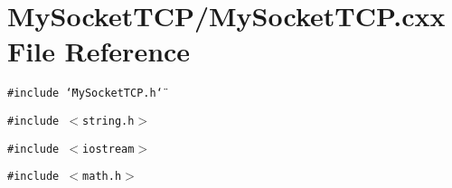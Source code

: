 \section{My\-Socket\-TCP/My\-Socket\-TCP.cxx File Reference}
\label{MySocketTCP_8cxx}
{\tt \#include \char`\"{}My\-Socket\-TCP.h\char`\"{}}\par
{\tt \#include $<$string.h$>$}\par
{\tt \#include $<$iostream$>$}\par
{\tt \#include $<$math.h$>$}\par
